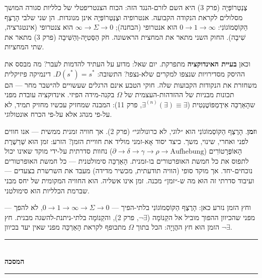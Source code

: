 \documentclass[10pt, openany, oneside]{book}
\renewcommand{\normalsize}{\fontsize{10}{13}\selectfont}
\begin{document}
צֶנְטְרוֹפְּיָה (פרק 3) היא השם לזרם-הנגד הזה: הכוח הצנטריפטלי של כלליות סגורה המושך מסלולים לקראת הנקודה הקבועה. אנטרופיה וצֶנְטְרוֹפְּיָה אינן מנוגדות. הן שני שלבי הָרֶצֶף הַקּוֹסְמוֹגוֹנִי: $0 \to 1 \to \infty$ הוא אנטרופי (הבחנה); $\infty \to \Sigma \to 0$ הוא צנטרופי (אינטגרציה, שִׁיבָה). החוק השני מתאר את המחצית הראשונה. חֹק הַסְּטִיָּה-וְהַשִּׁיבָה (פרק 3) מתאר את שתי המחציות.

וכאן \textbf{בעיית האינדוקציה} מתפרקת. יום שאל: מדוע על העתיד להדמות לעבר? מה מבסס את ההיסק מסדירויות שנצפו למקרים שלא-נצפו? התשובה: $D(s^*) = s^*$. דינמיקה פיזיקלית משחזרת את הנקודות הקבועות שלה. חוקי הטבע אינם הרגלים שעשויים להישבר מחר — הם תכונות מבניות של ההזדהות-העצמית של $\Omega$ בקנה-מידה הפיזי. אינדוקציה עובדת מפני שהָאַרְכֵּה אִידֶמְפּוֹטֶנְטִית ($\exists^{(n)}(\exists) \equiv \exists$, פרק 11): המבנה שמחזיק עכשיו מחזיק תמיד, לא על-פי מנהג אלא על-פי הכרח אונטולוגי.

ו\textbf{זמן}. הָרֶצֶף הַקּוֹסְמוֹגוֹנִי הוא ״לוגי, לא כרונולוגי״ (פרק 2). אך חוויה זמנית ממשית — אנו חווים לפני ואחרי, שינוי, משך. כיצד יסוד אָא-זמני מוליד את חוויית הזמן? הזרע: זמן הוּא שַׁרְשֶׁרֶת הָאוֹפֶּרָטוֹרִים ($\partial \to \delta \to \gamma \to \rho \to \text{Aufhebung}$) נחוות סדרתית על-ידי מוקד שאינו יכול לתפוס את כל חמשת האופרטורים בו-זמנית. הָאַרְכֵּה סימולטנית — כל חמשת האופרטורים נוכחים-יחד. אך מוקד סופי (הוויה תודעתית, מכשיר מדידה) מעבד את השרשרת בצעדים — ועיבוד סדרתי זה הוּא מה ש-״זמן״ מכנה. זמן אינו אשליה. הוא החוויה המקומית של יחס מבני שברמת הכלליות הוא סימולטני.

וחץ הזמן נזרע כאן: הָרֶצֶף הַקּוֹסְמוֹגוֹנִי בלתי-הפיך — $0 \to 1 \to \infty \to \Sigma \to 0$, לא להפך — מפני שהכיוון ההפוך מוביל אל הקֵנוֹמָה ($\neg\exists$, פרק 2), והקֵנוֹמָה בלתי-ניתנת-להשגה מבנית. חץ הזמן הוּא חץ ההֲוָיָה: הכל בתוך $\Omega$ מתכופף לקראת הָאַרְכֵּה מפני שאין יעד בכיוון $\neg\exists$.

\vspace{1.5em}


\begin{center}
    \rule{0.3\textwidth}{0.4pt}\\[0.5em]
    {\normalsize\bfseries\textsc{המסכה}}\\[0.3em]
    \rule{0.3\textwidth}{0.4pt}
\end{center}

\vspace{1em}
\end{document}
